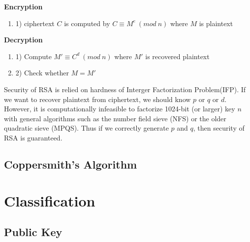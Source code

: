 \documentclass[a4paper]{article}
\begin{document}
\textbf{Encryption}
\begin{enumerate}[label=]
      \item 1) ciphertext $C$ is computed by  $C \equiv M^e \ (mod \ n)$ where $M$ is plaintext
\end{enumerate} 

\textbf{Decryption}
\begin{enumerate}[label=]
      \item 1) Compute $M' \equiv C^d \ (mod \ n)$ where $M'$ is recovered plaintext
      \item 2) Check whether $M=M'$
\end{enumerate} 

Security of RSA is relied on hardness of Interger Factorization Problem(IFP). If we want to recover plaintext from ciphertext, we should know $p$ or $q$ or $d$. However, it is computationally infeasible to factorize 1024-bit (or larger) key $n$ with general algorithms such as the number field sieve (NFS) or the older quadratic sieve (MPQS). Thus if we correctly generate $p$ and $q$, then security of RSA is guaranteed.

\subsection{Coppersmith's Algorithm}


\section{Classification}

\subsection{Public Key}
\end{document}
